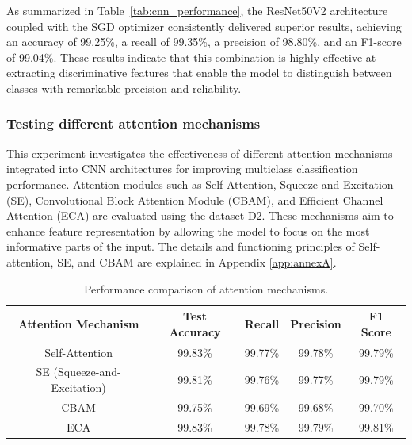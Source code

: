 \vspace{0.5cm}

As summarized in Table~\ref{tab:cnn_performance}, the ResNet50V2 architecture coupled with the SGD optimizer consistently delivered superior results, achieving an accuracy of 99.25\%, a recall of 99.35\%, a precision of 98.80\%, and an F1-score of 99.04\%. These results indicate that this combination is highly effective at extracting discriminative features that enable the model to distinguish between classes with remarkable precision and reliability.



\subsubsection{Testing different attention mechanisms}
This experiment investigates the effectiveness of different attention mechanisms integrated into CNN architectures for improving multiclass classification performance. Attention modules such as Self-Attention, Squeeze-and-Excitation (SE), Convolutional Block Attention Module (CBAM), and Efficient Channel Attention (ECA) are evaluated using the dataset D2. These mechanisms aim to enhance feature representation by allowing the model to focus on the most informative parts of the input. The details and functioning principles of Self-attention, SE, and CBAM are explained in Appendix \ref{app:annexA}.


\begin{table}[h!]
\centering
\caption{Performance comparison of attention mechanisms.}
\label{tab:attention_mechanisms}
\begin{tabular}{|c|c|c|c|c|}
\hline
\textbf{Attention Mechanism} & \textbf{Test Accuracy} & \textbf{Recall} & \textbf{Precision} & \textbf{F1 Score} \\
\hline
Self-Attention              & 99.83\% & 99.77\% & 99.78\% & 99.79\% \\
\hline
SE (Squeeze-and-Excitation)& 99.81\% & 99.76\% & 99.77\% & 99.79\% \\
\hline
CBAM                       & 99.75\% & 99.69\% & 99.68\% & 99.70\% \\
\hline
ECA                        & 99.83\% & 99.78\% & 99.79\% & 99.81\% \\
\hline
\end{tabular}
\end{table}

\vspace{0.5cm}

